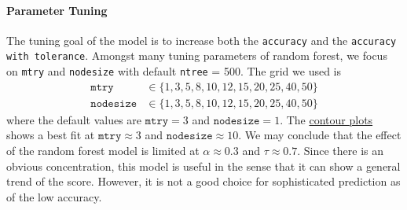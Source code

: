 \documentclass{article}
\begin{document}
\paragraph{Parameter Tuning}
The tuning goal of the model is to increase both the \texttt{accuracy} and the \texttt{accuracy with tolerance}.
Amongst many tuning parameters of random forest, we focus on \texttt{mtry} and \texttt{nodesize} with default 
\texttt{ntree} = 500. The grid we used is 
\begin{align*}
    \texttt{mtry} &\in \{1, 3, 5, 8, 10, 12, 15, 20, 25, 40,  50 \} \\
    \texttt{nodesize} &\in \{1, 3, 5, 8, 10, 12, 15, 20, 25, 40,  50 \}
\end{align*}
where the default values are $\texttt{mtry} = 3$ and $\texttt{nodesize} = 1$. 
The \hyperref[fig:contour]{contour plots} shows a best fit at $\texttt{mtry} \approx 3$ and $\texttt{nodesize} \approx 10$.
We may conclude that the effect of the random forest model is limited at $\alpha \approx 0.3$
and $\tau \approx 0.7$. Since there is an obvious concentration, 
this model is useful in the sense that it can show a general trend of the score.
However, it is not a good choice for sophisticated prediction as of the low accuracy.
\end{document}

